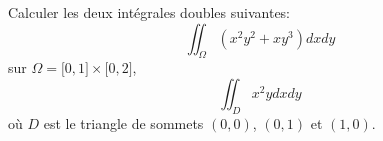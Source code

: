 
\begin{exercice}\label{exoexamens-0005}

    Calculer les deux intégrales doubles suivantes:
    \begin{equation}
        \iint_{\Omega}(x^2y^2+xy^3)dxdy
    \end{equation}
    sur \( \Omega=\mathopen[ 0 , 1 \mathclose]\times \mathopen[ 0 , 2 \mathclose]\),
    \begin{equation}
        \iint_D x^2ydxdy
    \end{equation}
    où \( D\) est le triangle de sommets \( (0,0)\), \( (0,1)\) et \( (1,0)\).

\end{exercice}
